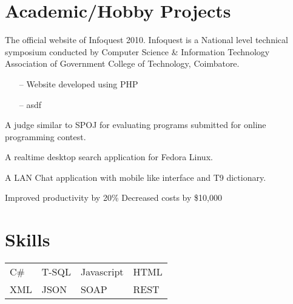 \documentclass{cv}
\begin{document}
\section{Academic/Hobby Projects}
\begin{description}[leftmargin=50pt,labelwidth=50pt]
\item[infoquestgct.com] The official website of Infoquest 2010.  Infoquest is a National level technical symposium conducted by Computer Science \& Information Technology Association of Government College of Technology, Coimbatore.
    \begin{itemize}[label={},leftmargin=10pt,topsep=0pt]
      \item[--] Website developed using PHP\@
      \item[--] asdf
    \end{itemize}
  \item[Online Judge] A judge similar to SPOJ for evaluating programs submitted for online programming contest.
  \item[Desktop Search] A realtime desktop search application for Fedora Linux.
  \item[SMS Simulator] A LAN Chat application with mobile like interface and T9 dictionary.
\end{description}

{Improved productivity by 20\%}
{Decreased costs by \$10,000}

\section{Skills}

\begin{tabular}{l l l l}
C\# & T-SQL & Javascript & HTML \\
XML & JSON & SOAP & REST
\end{tabular}
 
\end{document}
